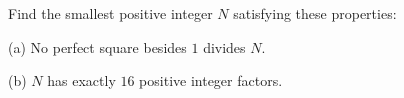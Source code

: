 Find the smallest positive integer $N$ satisfying these properties:

(a) No perfect square besides $1$ divides $N$.

(b) $N$ has exactly $16$ positive integer factors.

